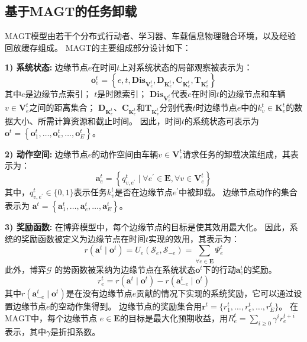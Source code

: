 \subsection{基于MAGT的任务卸载}
MAGT模型由若干个分布式行动者、学习器、车载信息物理融合环境，以及经验回放缓存组成。
MAGT的主要组成部分设计如下：

\textbf{1) 系统状态:} 边缘节点$e$在时间$t$上对系统状态的局部观察被表示为：
	\begin{equation}
		\boldsymbol{o}_{e}^{t}=\left\{e, t, \mathbf{Dis}_{\mathbf{V}_{e}^{t}}, \mathbf{D}_{\mathbf{K}_{e}^{t}}, \mathbf{C}_{\mathbf{K}_{e}^{t}}, \mathbf{T}_{\mathbf{K}_{v}^{t}}\right\}
	\end{equation} 
	\noindent 其中$e$是边缘节点索引；
	$t$是时隙索引；
	$\mathbf{Dis}_{\mathbf{V}_{e}^{t}}$代表$e$在时间$t$的边缘节点和车辆$v \in \mathbf{V}_{e}^{t}$之间的距离集合；
	$\mathbf{D}_{\mathbf{K}_{e}^{t}}$、$\mathbf{C}_{\mathbf{K}_{e}^{t}}$和$\mathbf{T}_{\mathbf{K}_{v}^{t}}$分别代表$t$时边缘节点$e$中的$k_{v}^{t} \in \mathbf{K}_{e}^{t}$的数据大小、所需计算资源和截止时间。
	因此，时间$t$的系统状态可表示为$\boldsymbol{o}^{t}=\left\{\boldsymbol{o}_{1}^{t}, \ldots, \boldsymbol{o}_{e}^{t}, \ldots, \boldsymbol{o}_{E}^{t}\right\}$。

\textbf{2) 动作空间:} 边缘节点$e$的动作空间由车辆$v \in \mathbf{V}_{e}^{t}$请求任务的卸载决策组成，其表示为：
	\begin{equation}
		\boldsymbol{a}_{e}^{t} = \left\{ q_{v, e^{\prime}}^t \mid \forall e^{\prime} \in \mathbf{E}, \forall v \in \mathbf{V}_{e}^{t} \right\}
	\end{equation}
	\noindent 其中，$q_{v, e^{\prime}}^t \in \{0, 1\}$表示任务$k_{v}^t$是否在边缘节点$e^{\prime}$中被卸载。
	边缘节点动作的集合表示为 $\boldsymbol{a}^{t} = \left\{\boldsymbol{a}_{1}^{t}, \ldots, \boldsymbol{a}_{e}^{t}, \ldots, \boldsymbol{a}_{E}^{t}\right\}$。
	
\textbf{3) 奖励函数:} 在博弈模型中，每个边缘节点的目标是使其效用最大化。
	因此，系统的奖励函数被定义为边缘节点在时间$t$实现的效用，其表示为：
	\begin{equation}
		r\left(\boldsymbol{a}^{t} \mid \boldsymbol{o}^{t}\right)= {U}_{e}\left(\mathcal{S}_{e}, \mathcal{S}_{-e}\right) = \sum_{\forall e \in \mathbf{E}} \Psi_{e}^{t}
		\label{equ 3-32}
	\end{equation}
	此外，博弈$\mathcal{G}$ 的势函数被采纳为边缘节点在系统状态$\boldsymbol{o}^{t}$下的行动$\boldsymbol{a}_{e}^{t}$的奖励。
	\begin{equation}
		r_{e}^{t} = r\left(\boldsymbol{a}^{t} \mid \boldsymbol{o}^{t}\right)-r\left(\boldsymbol{a}_{-e}^{t} \mid \boldsymbol{o}^{t}\right)
		\label{equ 3-33}
	\end{equation}
	\noindent 其中$r\left(\boldsymbol{a}_{-e}^{t} \mid \boldsymbol{o}^{t}\right)$是在没有边缘节点$e$贡献的情况下实现的系统奖励，它可以通过设置边缘节点$e$的空动作集得到。
	边缘节点的奖励集合用$\boldsymbol{r}^{t} = \{r_{1}^{t}, \ldots, r_{e}^{t}, \ldots, r_{E}^{t}\}$。
	在MAGT中，每个边缘节点 $e \in \mathbf{E}$的目标是最大化预期收益，用$R_{e}^{t} = \sum_{i \geq 0} \gamma^{i} r_{e}^{t+i}$表示，其中$\gamma$是折扣系数。

